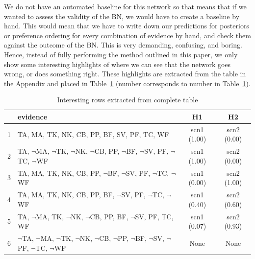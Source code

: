 \documentclass[12pt]{article}
\begin{document}
We do not have an automated baseline for this network so that means that if we wanted to assess the validity of the BN, we would have to create a baseline by hand. This would mean that we have to write down our predictions for posteriors or preference ordering for every combination of evidence by hand, and check them against the outcome of the BN. This is very demanding, confusing, and boring. Hence, instead of fully performing the method outlined in this paper, we only show some interesting highlights of where we can see that the network goes wrong, or does something right. These highlights are extracted from the table in the Appendix and placed in Table~\ref{cases} (number corresponds to number in Table~\ref{cases}).


\begin{table}[htbp]
\begin{center}
\begin{tabular}{|l|l|c|c|}
\hline
 & evidence & H1 & H2  \\
\hline
1 & TA, MA, TK, NK, CB, PP, BF, SV, PF, TC, WF & scn1 (1.00) & scn2 (0.00)\\
2 & TA, $\neg$MA, $\neg$TK, $\neg$NK, $\neg$CB, PP, $\neg$BF, $\neg$SV, PF, $\neg$TC, $\neg$WF & scn1 (1.00) & scn2 (0.00)\\
3 & TA, MA, TK, NK, CB, PP, $\neg$BF, $\neg$SV, PF, $\neg$TC, $\neg$WF & scn1 (0.00) & scn2 (1.00)\\
4 & TA, MA, TK, NK, CB, PP, BF, $\neg$SV, PF, $\neg$TC, $\neg$WF & scn1 (0.40) & scn2 (0.60)\\
5 & TA, $\neg$MA, TK, $\neg$NK, $\neg$CB, PP, BF, $\neg$SV, PF, TC, WF & scn1 (0.07) & scn2 (0.93)\\
6 & $\neg$TA, $\neg$MA, $\neg$TK, $\neg$NK, $\neg$CB, $\neg$PP, $\neg$BF, $\neg$SV, $\neg$PF, $\neg$TC, $\neg$WF & None & None\\

\hline
\end{tabular}
\end{center}
\caption{ Interesting rows extracted from complete table}
\label{cases}
\end{table}
\end{document}
